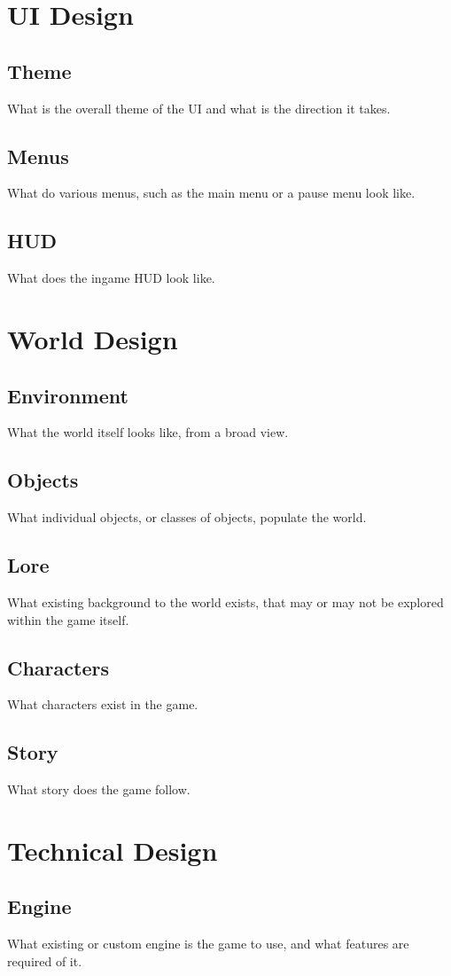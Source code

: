 \section{UI Design}
\subsection{Theme}
What is the overall theme of the UI and what is the direction it takes.
\subsection{Menus}
What do various menus, such as the main menu or a pause menu look like.
\subsection{HUD}
What does the ingame HUD look like.

\section{World Design}
\subsection{Environment}
What the world itself looks like, from a broad view.
\subsection{Objects}
What individual objects, or classes of objects, populate the world.
\subsection{Lore}
What existing background to the world exists, that may or may not be explored within the game itself.
\subsection{Characters}
What characters exist in the game.
\subsection{Story}
What story does the game follow.

\section{Technical Design}
\subsection{Engine}
What existing or custom engine is the game to use, and what features are required of it.
